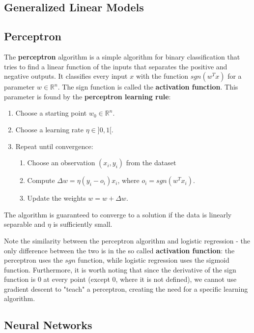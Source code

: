 \documentclass{article}
\newcommand{\R}{\mathbb{R}}
\begin{document}
\subsection{Generalized Linear Models}

\subsection{Perceptron}

The \textbf{perceptron} algorithm is a simple algorithm for binary classification that tries to find a linear function of the inputs that separates the positive and negative outputs.
It classifies every input $x$ with the function $sgn(w^T x)$ for a parameter $w \in \R^n$.
The sign function is called the \textbf{activation function}.
This parameter is found by the \textbf{perceptron learning rule}:
\begin{enumerate}
\item Choose a starting point $w_0 \in \R^n$.
\item Choose a learning rate $\eta \in ]0,1[$.
\item Repeat until convergence:
\begin{enumerate}
\item Choose an observation $(x_i, y_i)$ from the dataset
\item Compute $\Delta w = \eta (y_i - o_i) x_i$, where $o_i = sgn(w^T x_i)$.
\item Update the weights $w = w + \Delta w$.
\end{enumerate}
\end{enumerate}

The algorithm is guaranteed to converge to a solution if the data is linearly separable and $\eta$ is sufficiently small.

Note the similarity between the perceptron algorithm and logistic regression - the only difference between the two is in the so called \textbf{activation function}: the perceptron uses the $sgn$ function, while logistic regression uses the sigmoid function.
Furthermore, it is worth noting that since the derivative of the sign function is 0 at every point (except 0, where it is not defined), we cannot use gradient descent to "teach" a perceptron, creating the need for a specific learning algorithm.

\subsection{Neural Networks}
\end{document}
